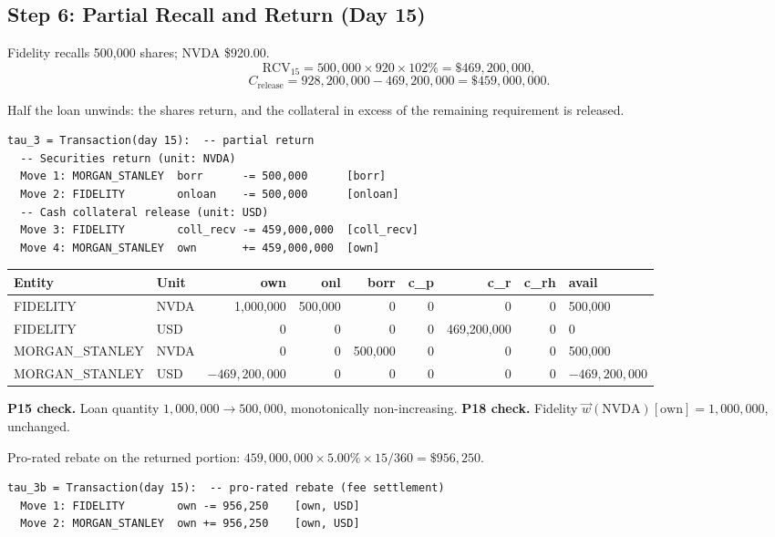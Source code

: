 \subsection{Step 6: Partial Recall and Return (Day 15)}
\label{sec:us-step6}

Fidelity recalls 500{,}000 shares; NVDA \$920.00.
\[
\mathrm{RCV}_{15} = 500{,}000 \times 920 \times 102\% = \$469{,}200{,}000,
\]
\[
C_{\mathrm{release}} = 928{,}200{,}000 - 469{,}200{,}000 = \$459{,}000{,}000.
\]

\noindent Half the loan unwinds: the shares return, and the collateral in excess of the remaining requirement is released.

\begin{lstlisting}
tau_3 = Transaction(day 15):  -- partial return
  -- Securities return (unit: NVDA)
  Move 1: MORGAN_STANLEY  borr      -= 500,000      [borr]
  Move 2: FIDELITY        onloan    -= 500,000      [onloan]
  -- Cash collateral release (unit: USD)
  Move 3: FIDELITY        coll_recv -= 459,000,000  [coll_recv]
  Move 4: MORGAN_STANLEY  own       += 459,000,000  [own]
\end{lstlisting}

\begin{center}\footnotesize\setlength{\tabcolsep}{4pt}
\begin{tabular}{l l r r r r r r l}
\toprule
\textbf{Entity} & \textbf{Unit} & own & onl & borr & c\_p & c\_r & c\_rh & avail \\
\midrule
FIDELITY & NVDA & 1{,}000{,}000 & 500{,}000 & 0 & 0 & 0 & 0 & 500{,}000 \\
FIDELITY & USD & 0 & 0 & 0 & 0 & 469{,}200{,}000 & 0 & 0 \\
\midrule
MORGAN\_STANLEY & NVDA & 0 & 0 & 500{,}000 & 0 & 0 & 0 & 500{,}000 \\
MORGAN\_STANLEY & USD & $-469{,}200{,}000$ & 0 & 0 & 0 & 0 & 0 & $-469{,}200{,}000$ \\
\bottomrule
\end{tabular}
\end{center}

\noindent\textbf{P15 check.} Loan quantity $1{,}000{,}000 \to 500{,}000$, monotonically non-increasing. \checkmark\quad
\textbf{P18 check.} Fidelity $\vec{w}(\text{NVDA})[\mathrm{own}] = 1{,}000{,}000$, unchanged. \checkmark

\noindent Pro-rated rebate on the returned portion: $459{,}000{,}000 \times 5.00\% \times 15/360 = \$956{,}250$.

\begin{lstlisting}
tau_3b = Transaction(day 15):  -- pro-rated rebate (fee settlement)
  Move 1: FIDELITY        own -= 956,250    [own, USD]
  Move 2: MORGAN_STANLEY  own += 956,250    [own, USD]
\end{lstlisting}

